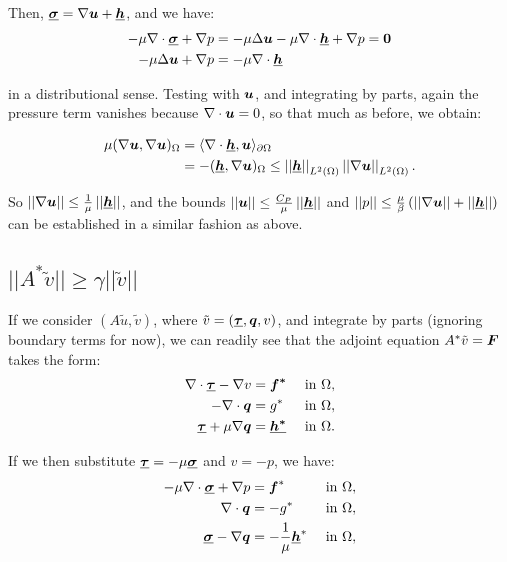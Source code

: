 Then, $\NVRtensor{\sigma} = \NVRgrad \vect{u} + \NVRtensor{h}$, and we have:
\begin{align*}
- \mu \NVRdiv \NVRtensor{\sigma} + \NVRgrad p &= - \mu \Delta \vect{u} - \mu \NVRdiv \NVRtensor{h} + \NVRgrad p = \vect{0} \\
- \mu \Delta \vect{u} + \NVRgrad p &= - \mu  \NVRdiv \NVRtensor{h}
\end{align*}

in a distributional sense.  Testing with $\vect{u}$, and integrating by parts, again the pressure term vanishes because $\NVRdiv \vect{u} = 0$, so that much as before, we obtain:

\begin{align*}
\mu (\NVRgrad \vect{u}, \NVRgrad \vect{u})_{\Omega} &= \langle \NVRdiv \NVRtensor{h}, \vect{u} \rangle_{\partial \Omega}\\
&= -(\NVRtensor{h}, \NVRgrad \vect{u})_{\Omega} \leq \norm{\NVRtensor{h}}_{L^{2}(\Omega)} \norm{ \NVRgrad \vect{u} }_{L^{2}(\Omega)}.
\end{align*}

So $\norm{\NVRgrad \vect{u}} \leq \frac{1}{\mu} \norm{\NVRtensor{h}}$, and the bounds $\norm{\vect{u} } \leq \frac{C_{P}}{\mu} \norm{\NVRtensor{h}}$ and $\norm{p} \leq \frac{\mu}{\beta}\left( \norm{ \NVRgrad \vect{u} } + \norm{\NVRtensor{h}} \right)$ can be established in a similar fashion as above.

\subsection{$||A^{*} \tilde{v}|| \geq \gamma ||\tilde{v}||$}  If we consider $(A \tilde{u}, \tilde{v})$, where $\tilde{v} = (\NVRtensor{\tau},\vect{q}, v)$, and integrate by parts (ignoring boundary terms for now), we can readily see that the adjoint equation $A^{*} \tilde{v} = \vect{F}$ takes the form:
\begin{align}
\NVRdiv \NVRtensor{\tau} - \NVRgrad v &= \vect{f^{*}} & \text{ in } \Omega, \\
- \NVRdiv \vect{q} &= g^{*} & \text{ in } \Omega, \\
\NVRtensor{\tau} + \mu \NVRgrad \vect{q} &= \NVRtensor{h^{*}} & \text{ in } \Omega.
\end{align}

If we then substitute $\NVRtensor{\tau} = - \mu \NVRtensor{\sigma}$ and $v = -p$, we have:
\begin{align}
- \mu \NVRdiv \NVRtensor{\sigma} + \NVRgrad p &= \vect{f}^{*} & \text{ in } \Omega, \\
\NVRdiv \vect{q} &= -g^{*} & \text{ in } \Omega, \\
\NVRtensor{\sigma} - \NVRgrad \vect{q} &= - \frac{1}{\mu} \NVRtensor{h}^{*} & \text{ in } \Omega,
\end{align}

